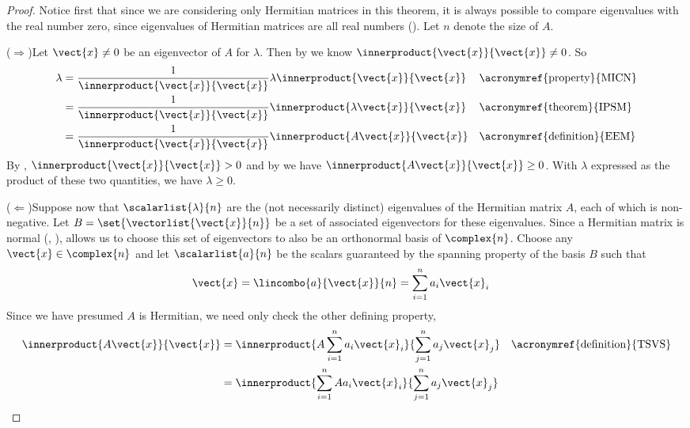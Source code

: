 \begin{proof}
%
Notice first that since we are considering only Hermitian matrices in this theorem, it is always possible to compare eigenvalues with the real number zero, since eigenvalues of Hermitian matrices are all real numbers ().  Let $n$ denote the size of $A$.\par
%
($\Rightarrow$)\quad Let $\vect{x}\neq 0$ be an eigenvector of $A$ for $\lambda$.  Then by  we know $\innerproduct{\vect{x}}{\vect{x}}\neq 0$.  So
%
\begin{align*}
\lambda
&=\frac{1}{\innerproduct{\vect{x}}{\vect{x}}}\lambda\innerproduct{\vect{x}}{\vect{x}}
&&\text{\acronymref{property}{MICN}}\\
%
&=\frac{1}{\innerproduct{\vect{x}}{\vect{x}}}\innerproduct{\lambda\vect{x}}{\vect{x}}
&&\text{\acronymref{theorem}{IPSM}}\\
%
&=\frac{1}{\innerproduct{\vect{x}}{\vect{x}}}\innerproduct{A\vect{x}}{\vect{x}}
&&\text{\acronymref{definition}{EEM}}
%
\end{align*}
%
By , $\innerproduct{\vect{x}}{\vect{x}}>0$ and by  we have $\innerproduct{A\vect{x}}{\vect{x}}\geq 0$.  With $\lambda$ expressed as the product of these two quantities, we have $\lambda\geq 0$.\par
%
($\Leftarrow$)\quad  Suppose now that $\scalarlist{\lambda}{n}$ are the (not necessarily distinct) eigenvalues of the Hermitian matrix $A$, each of which is non-negative.  Let $B=\set{\vectorlist{\vect{x}}{n}}$ be a set of associated eigenvectors for these eigenvalues.  Since a Hermitian matrix is normal (, ),  allows us to choose this set of eigenvectors to also be an orthonormal basis of $\complex{n}$.  Choose any $\vect{x}\in\complex{n}$ and let $\scalarlist{a}{n}$ be the scalars guaranteed by the spanning property of the basis $B$ such that
%
\begin{align*}
\vect{x}&=\lincombo{a}{\vect{x}}{n}=\sum_{i=1}^{n}a_i\vect{x}_i
\end{align*}
%
Since we have presumed $A$ is Hermitian, we need only check the other defining property,
%
\begin{align*}
\innerproduct{A\vect{x}}{\vect{x}}
&=
\innerproduct{A\sum_{i=1}^{n}a_i\vect{x}_i}{\sum_{j=1}^{n}a_j\vect{x}_j}
&&\text{\acronymref{definition}{TSVS}}\\
%
&=
\innerproduct{\sum_{i=1}^{n}Aa_i\vect{x}_i}{\sum_{j=1}^{n}a_j\vect{x}_j}

\end{align*}
\end{proof}
